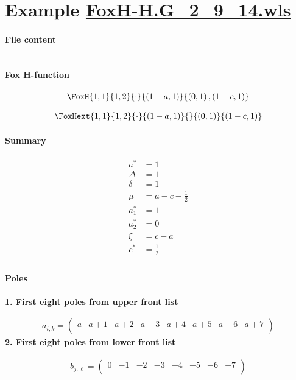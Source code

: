 \documentclass[11pt]{article}
\begin{document}
\section{Example \url{FoxH-H.G_2_9_14.wls}}

\paragraph{File content}

\inputminted{text}{FoxH-H.G_2_9_14.wls}

\paragraph{Fox H-function}

\begin{align*}
  \FoxH
    {1,1}
    {1,2}
    {\cdot}
    {\left(1-a, 1\right)}
    {\left(0, 1\right), \left(1-c, 1\right)}
\end{align*}

\begin{align*}
  \FoxHext
    {1,1}
    {1,2}
    {\cdot}
    {\left(1-a, 1\right)}
    {}
    {\left(0, 1\right)}
    {\left(1-c, 1\right)}
\end{align*}

\paragraph{Summary}

\begin{align*}
  a^*    & = 1 \\
  \Delta & = 1 \\
  \delta & = 1 \\
  \mu    & = a-c-\frac{1}{2} \\
  a_1^*  & = 1 \\
  a_2^*  & = 0 \\
  \xi    & = c-a \\
  c^*    & = \frac{1}{2} \\
\end{align*}

\paragraph{Poles}

\noindent\textbf{1. First eight poles from upper front list}

\begin{align*}
  a_{i,k} = 
  \left(
\begin{array}{cccccccc}
 a & a+1 & a+2 & a+3 & a+4 & a+5 & a+6 & a+7 \\
\end{array}
\right)
\end{align*}
\noindent\textbf{2. First eight poles from lower front list}

\begin{align*}
  b_{j,\ell} = 
  \left(
\begin{array}{cccccccc}
 0 & -1 & -2 & -3 & -4 & -5 & -6 & -7 \\
\end{array}
\right)
\end{align*}

\printbibliography[title={References}]
\end{document}
